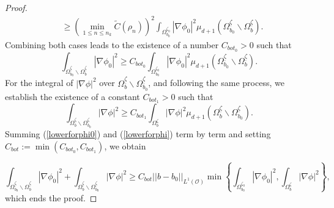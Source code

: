 \documentclass[11pt]{article}
\begin{document}
\begin{proof}
\begin{equation*}
\begin{split}
			&\geq \left(\min_{1\leq n\leq n_k}\widetilde{C}(\rho_{n})\right)^2 \displaystyle\int_{\Omega_{b_0}^{\zeta_0}}|\nabla\phi_0|^2\mu_{d+1} (\Omega_{b_0}^{\underline{\zeta}}\backslash\Omega_b^{\underline{\zeta}}).
		\end{split}
	\end{equation*}
	Combining both cases leads to the existence of  a number $C_{bot_0}>0$ such that 
	\begin{equation}\label{lowerforphi0}
		\displaystyle\int_{\Omega_{b_0}^{\underline{\zeta}}\backslash \Omega_{b}^{\underline{\zeta}}}\left|\nabla\phi_0\right|^2\geq C_{bot_0}\displaystyle\int_{\Omega_{b_0}^{\zeta_0}}|\nabla\phi_0|^2\mu_{d+1} (\Omega_{b_0}^{\underline{\zeta}}\backslash\Omega_b^{\underline{\zeta}}).
	\end{equation}
	For the integral of $|\nabla\phi|^2$ over $\Omega_{b}^{\underline{\zeta}}
	\backslash\Omega_{b_0}^{\underline{\zeta}}$, and following the same process, %
      we establish the existence of a constant $C_{bot_1}>0$ such that
	\begin{equation}\label{lowerforphi}
		\displaystyle\int_{\Omega_{b}^{\underline{\zeta}}\backslash \Omega_{b_0}^{\underline{\zeta}}}\left|\nabla\phi\right|^2\geq C_{bot_1}\displaystyle\int_{\Omega_{b}^{\zeta}}|\nabla\phi|^2\mu_{d+1} (\Omega_{b}^{\underline{\zeta}}\backslash\Omega_{b_0}^{\underline{\zeta}}).
	\end{equation}
	Summing  (\ref{lowerforphi0}) and (\ref{lowerforphi}) term by term and setting $C_{bot}:=\min\left(C_{bot_0},C_{bot_1}\right)$, we obtain
	
	$$\displaystyle\int_{\Omega_{b_0}^{\underline{\zeta}}\backslash \Omega_{b}^{\underline{\zeta}}}\left|\nabla\phi_0\right|^2+\displaystyle\int_{\Omega_{b}^{\underline{\zeta}}\backslash \Omega_{b_0}^{\underline{\zeta}}}\left|\nabla\phi\right|^2\geq C_{bot}||b-b_0||_{L^1(\mathcal O )}\min\left\{\displaystyle\int_{\Omega_{b_0}^{\zeta_0}}|\nabla \phi_0|^2,\displaystyle\int_{\Omega_{b}^{\zeta}}|\nabla \phi|^2\right\},$$
	which ends the proof.
\end{proof}
\end{document}
